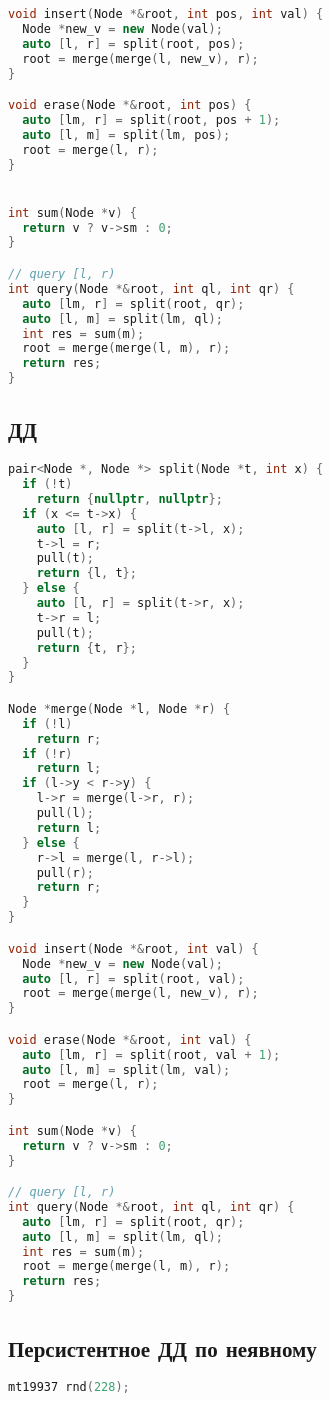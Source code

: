 \documentclass[10pt,a4paper,landscape,twosided]{extarticle}
\begin{document}
\begin{multicols*}{3}
\begin{lstlisting}[language=C++]
void insert(Node *&root, int pos, int val) {
  Node *new_v = new Node(val);
  auto [l, r] = split(root, pos);
  root = merge(merge(l, new_v), r);
}

void erase(Node *&root, int pos) {
  auto [lm, r] = split(root, pos + 1);
  auto [l, m] = split(lm, pos);
  root = merge(l, r);
}


int sum(Node *v) {
  return v ? v->sm : 0;
}

// query [l, r)
int query(Node *&root, int ql, int qr) {
  auto [lm, r] = split(root, qr);
  auto [l, m] = split(lm, ql);
  int res = sum(m);
  root = merge(merge(l, m), r);
  return res;
}
\end{lstlisting}

\subsection{ДД}
\begin{lstlisting}[language=C++]
pair<Node *, Node *> split(Node *t, int x) {
  if (!t)
    return {nullptr, nullptr};
  if (x <= t->x) {
    auto [l, r] = split(t->l, x);
    t->l = r;
    pull(t);
    return {l, t};
  } else {
    auto [l, r] = split(t->r, x);
    t->r = l;
    pull(t);
    return {t, r};
  }
}

Node *merge(Node *l, Node *r) {
  if (!l)
    return r;
  if (!r)
    return l;
  if (l->y < r->y) {
    l->r = merge(l->r, r);
    pull(l);
    return l;
  } else {
    r->l = merge(l, r->l);
    pull(r);
    return r;
  }
}

void insert(Node *&root, int val) {
  Node *new_v = new Node(val);
  auto [l, r] = split(root, val);
  root = merge(merge(l, new_v), r);
}

void erase(Node *&root, int val) {
  auto [lm, r] = split(root, val + 1);
  auto [l, m] = split(lm, val);
  root = merge(l, r);
}

int sum(Node *v) {
  return v ? v->sm : 0;
}

// query [l, r)
int query(Node *&root, int ql, int qr) {
  auto [lm, r] = split(root, qr);
  auto [l, m] = split(lm, ql);
  int res = sum(m);
  root = merge(merge(l, m), r);
  return res;
}
\end{lstlisting}

\subsection{Персистентное ДД по неявному}
\begin{lstlisting}[language=C++]
mt19937 rnd(228);


\end{lstlisting}
\end{multicols*}
\end{document}
